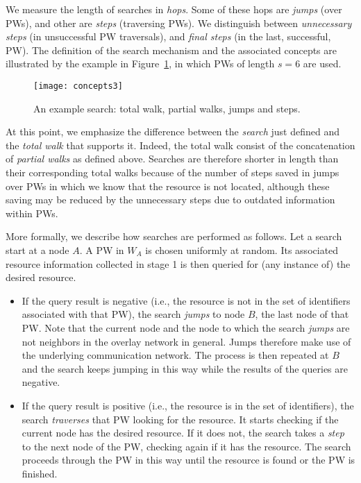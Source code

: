 \documentclass[]{elsarticle}
\newcommand{\s}		{\ensuremath{s}}		\newcommand{\sopt}	{\ensuremath{s_{opt}}}		\newcommand{\p}		{\ensuremath{p}}		\newcommand{\W}		{\ensuremath{W}}		\newcommand{\w}		{\ensuremath{w}}		\newcommand{\lsave}	{\ensuremath{\overline{l}_s}}	\newcommand{\lave}	{\ensuremath{\overline{l}}}	\newcommand{\lopt}	{\ensuremath{\overline{l}_{opt}}}
\begin{document}
\begin{enumerate}
We measure the length of searches in \emph{hops}. Some of these hops are \emph{jumps} (over PWs), and other are \emph{steps} (traversing PWs). We distinguish between \emph{unnecessary steps} (in unsuccessful PW traversals), and \emph{final steps} (in the last, successful, PW).
The definition of the search mechanism and the associated concepts are illustrated by the example in Figure~\ref{fig:concepts}, in which PWs of length $\s=6$ are used.

\begin{figure}
 \centering
 \texttt{[image: concepts3]}
 \caption{An example search: total walk, partial walks, jumps and steps.}
 \label{fig:concepts}
\end{figure}

At this point, we emphasize the difference between the \emph{search} just defined and the \emph{total walk} that supports it. Indeed, the total walk consist of the concatenation of \emph{partial walks} as defined above. Searches are therefore shorter in length than their corresponding total walks because of the number of steps saved in jumps over PWs in which we know that the resource is not located, although these saving may be reduced by the unnecessary steps due to outdated information within PWs.

More formally, we describe how searches are performed as follows. Let a search start at a node $A$. A PW in $\W_A$ is chosen uniformly at random. Its associated resource information collected in stage 1 is then queried for (any instance of) the desired resource. 

\begin{itemize}
\item
If the query result is negative (i.e., the resource is not in the set of identifiers associated with that PW), the search \emph{jumps} to node $B$, the last node of that PW. Note that the current node and the node to which the search \emph{jumps} are not neighbors in the overlay network in general. Jumps therefore make use of the underlying communication network.
The process is then repeated at $B$ and the search keeps jumping in this way while the results of the queries are negative. 

\item
If the query result is positive (i.e., the resource is in the set of identifiers), the search \emph{traverses} that PW looking for the resource. It starts checking if the current node has the desired resource. If it does not, the search takes a \emph{step} to the next node of the PW, checking again if it has the resource. The search proceeds through the PW in this way until the resource is found or the PW is finished.


\end{itemize}
\end{enumerate}
\end{document}
